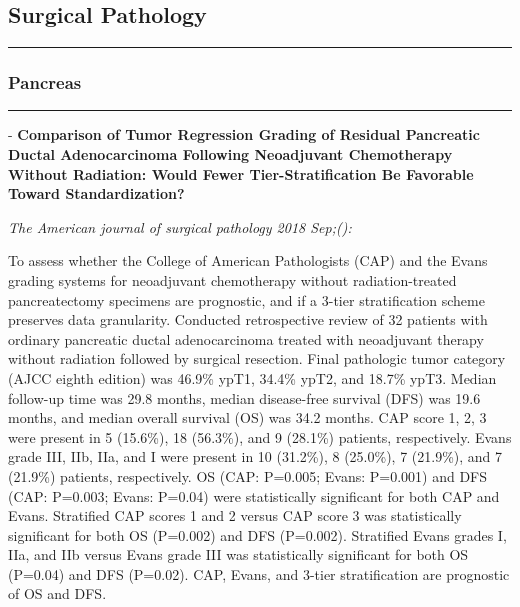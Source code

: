 \documentclass[]{article}
\begin{document}
\hypertarget{surgical-pathology}{%
\subsection{Surgical Pathology}\label{surgical-pathology}}

\begin{center}\rule{0.5\linewidth}{\linethickness}\end{center}

\hypertarget{pancreas}{%
\subsubsection{Pancreas}\label{pancreas}}

\begin{center}\rule{0.5\linewidth}{\linethickness}\end{center}

 - \textbf{Comparison of Tumor Regression Grading of Residual Pancreatic
Ductal Adenocarcinoma Following Neoadjuvant Chemotherapy Without
Radiation: Would Fewer Tier-Stratification Be Favorable Toward
Standardization?}

\emph{The American journal of surgical pathology 2018 Sep;():}

To assess whether the College of American Pathologists (CAP) and the
Evans grading systems for neoadjuvant chemotherapy without
radiation-treated pancreatectomy specimens are prognostic, and if a
3-tier stratification scheme preserves data granularity. Conducted
retrospective review of 32 patients with ordinary pancreatic ductal
adenocarcinoma treated with neoadjuvant therapy without radiation
followed by surgical resection. Final pathologic tumor category (AJCC
eighth edition) was 46.9\% ypT1, 34.4\% ypT2, and 18.7\% ypT3. Median
follow-up time was 29.8 months, median disease-free survival (DFS) was
19.6 months, and median overall survival (OS) was 34.2 months. CAP score
1, 2, 3 were present in 5 (15.6\%), 18 (56.3\%), and 9 (28.1\%)
patients, respectively. Evans grade III, IIb, IIa, and I were present in
10 (31.2\%), 8 (25.0\%), 7 (21.9\%), and 7 (21.9\%) patients,
respectively. OS (CAP: P=0.005; Evans: P=0.001) and DFS (CAP: P=0.003;
Evans: P=0.04) were statistically significant for both CAP and Evans.
Stratified CAP scores 1 and 2 versus CAP score 3 was statistically
significant for both OS (P=0.002) and DFS (P=0.002). Stratified Evans
grades I, IIa, and IIb versus Evans grade III was statistically
significant for both OS (P=0.04) and DFS (P=0.02). CAP, Evans, and
3-tier stratification are prognostic of OS and DFS.
\end{document}
